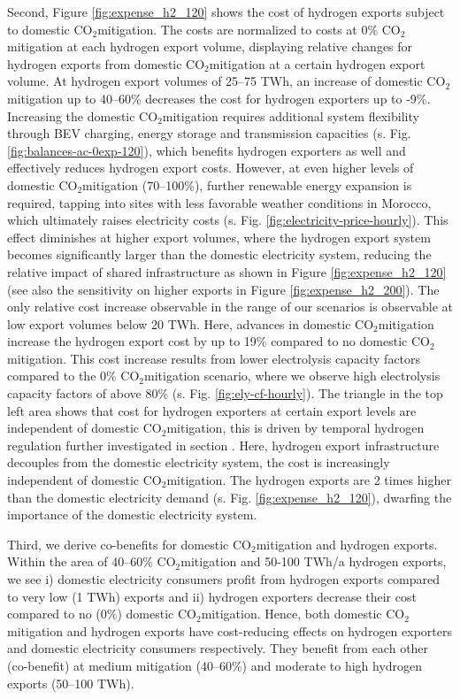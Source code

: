 \documentclass[5p,numafflabel]{elsarticle}
\newcommand{\co}{\ce{CO2}~}
\def\co{CO${}_2${\:}}
\begin{document}
Second, Figure \ref{fig:expense_h2_120} shows the cost of hydrogen exports subject to domestic \co mitigation. The costs are normalized to costs at 0\% \co mitigation at each hydrogen export volume, displaying relative changes for hydrogen exports from domestic \co mitigation at a certain hydrogen export volume.
At hydrogen export volumes of 25--75 TWh, an increase of domestic \co mitigation up to 40--60\% decreases the cost for hydrogen exporters up to -9\%. 
Increasing the domestic \co mitigation requires additional 
system flexibility through BEV charging, energy storage and transmission capacities (s. Fig. \ref{fig:balances-ac-0exp-120}), which 
benefits hydrogen exporters as well and effectively reduces hydrogen export costs. 
However, at even higher levels of domestic \co mitigation (70--100\%), further renewable energy expansion is required, tapping into sites with less favorable weather conditions in Morocco, which ultimately raises electricity costs (s. Fig. \ref{fig:electricity-price-hourly}).
This effect diminishes at higher export volumes, where the hydrogen export system becomes significantly larger than the domestic electricity system, reducing the relative impact of shared infrastructure as shown in Figure \ref{fig:expense_h2_120} (see also the sensitivity on higher exports in Figure \ref{fig:expense_h2_200}). 
The only relative cost increase observable in the range of our scenarios is observable at low export volumes below 20 TWh. Here, advances in domestic \co mitigation increase the hydrogen export cost by up to 19\% compared to no domestic \co mitigation.
This cost increase results from lower electrolysis capacity factors compared to the 0\% \co mitigation scenario, where we observe high electrolysis capacity factors of above 80\% (s. Fig. \ref{fig:ely-cf-hourly}).
The triangle in the top left area shows that cost for hydrogen exporters at certain export levels are independent of domestic \co mitigation, this is driven by temporal hydrogen regulation further investigated in section . Here, hydrogen export infrastructure decouples from the domestic electricity system, the cost is increasingly independent of domestic \co mitigation. The hydrogen exports are 2 times higher than the domestic electricity demand (s. Fig. \ref{fig:expense_h2_120}), dwarfing the importance of the domestic electricity system.


Third, we derive co-benefits for domestic \co mitigation and hydrogen exports. 
Within the area of 40--60\% \co mitigation and 50-100 TWh/a hydrogen exports, we see i) domestic electricity consumers profit from hydrogen exports compared to very low (1 TWh) exports and ii) hydrogen exporters decrease their cost compared to no (0\%) domestic \co mitigation. 
Hence, both domestic \co mitigation and hydrogen exports have cost-reducing effects on hydrogen exporters and domestic electricity consumers respectively. They benefit from each other (co-benefit) at medium mitigation (40--60\%) and moderate to high hydrogen exports (50--100 TWh). 
\end{document}
